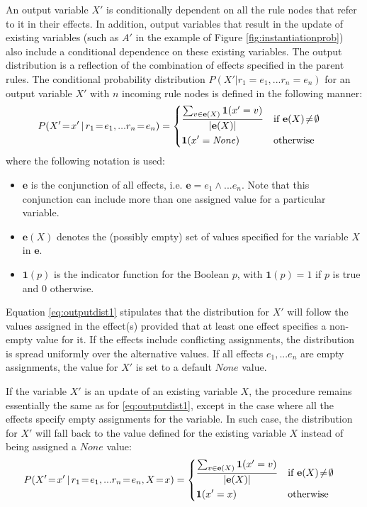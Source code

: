 An output variable $X'$ is conditionally dependent on all the rule nodes that refer to it in their effects.  In addition, output variables that result in the update of existing variables (such as $A'$ in the example of Figure \ref{fig:instantiationprob}) also include a conditional dependence on these existing variables. The output distribution is a reflection of the combination of effects specified in the parent rules. The conditional probability distribution $P(X'|r_1\!=\!e_1,...r_n\!=\!e_n)$ for an output variable $X'$ with $n$ incoming rule nodes is defined in the following manner:
\begin{align}
&P(X'\!=\!x' \, | \, r_1\!=\!e_1,... r_n\!=\!e_n) = \begin{dcases}
\frac{\sum_{v \in {\mathbf{e}(X)}} \mathbf{1}(x' = v)} { |\mathbf{e}(X)| } & \text{if } \mathbf{e}(X)\!\neq\!\emptyset \\
\mathbf{1}(x' = \mathit{None}) & \text{otherwise}
\end{dcases}
\label{eq:outputdist1}
\end{align}
where the following notation is used: \begin{itemize}
\item $\mathbf{e}$ is the conjunction of all effects, i.e. $\mathbf{e} = e_1 \land ... e_n$.  Note that this conjunction can include more than one assigned value for a particular variable.
\item $\mathbf{e}(X)$ denotes the (possibly empty) set of values specified for the variable $X$ in $\mathbf{e}$. 
\item $\mathbf{1}(p)$ is the indicator function for the Boolean $p$, with $\mathbf{1}(p)=1$ if $p$ is true and $0$ otherwise.
\end{itemize}

Equation \eqref{eq:outputdist1} stipulates that the distribution for $X'$ will follow the values assigned in the effect(s) provided that at least one effect specifies a non-empty value for it. If the effects include conflicting assignments, the distribution is spread uniformly over the alternative values. If all effects $e_1,...e_n$ are empty assignments, the value for $X'$ is set to a default $None$ value.

If the variable $X'$ is an update of an existing variable $X$, the procedure remains essentially the same as for \eqref{eq:outputdist1}, except in the case where all the effects specify empty assignments for the variable. In such case, the distribution for $X'$ will fall back to the value defined for the existing variable $X$ instead of being assigned a $\mathit{None}$ value:
\begin{align}
&P(X'\!=\!x' \, | \, r_1\!=\!e_1,... r_n\!=\!e_n, X\!=\!x) = \begin{dcases} 
\frac{\sum_{v \in {\mathbf{e}(X)}} \mathbf{1}(x' = v)} { |\mathbf{e}(X)| }  & \text{if } \mathbf{e}(X)\!\neq\!\emptyset \\
\mathbf{1}(x' = x) & \text{otherwise}
\end{dcases}\label{eq:outputdist2}
\end{align}

